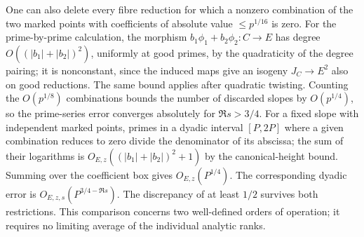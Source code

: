 \documentclass[11pt]{article}
\begin{document}
One can also delete every fibre reduction for which a nonzero combination of the two marked points with coefficients of absolute value $\le p^{1/16}$ is zero. For the prime-by-prime calculation, the morphism $b_1\phi_1+b_2\phi_2:C\to E$ has degree $O((|b_1|+|b_2|)^2)$, uniformly at good primes, by the quadraticity of the degree pairing; it is nonconstant, since the induced maps give an isogeny $J_C\to E^2$ also on good reductions. The same bound applies after quadratic twisting. Counting the $O(p^{1/8})$ combinations bounds the number of discarded slopes by $O(p^{1/4})$, so the prime-series error converges absolutely for $\Re s>3/4$. For a fixed slope with independent marked points, primes in a dyadic interval $[P,2P]$ where a given combination reduces to zero divide the denominator of its abscissa; the sum of their logarithms is $O_{E,z}((|b_1|+|b_2|)^2+1)$ by the canonical-height bound. Summing over the coefficient box gives $O_{E,z}(P^{1/4})$. The corresponding dyadic error is $O_{E,z,s}(P^{3/4-\Re s})$. The discrepancy of at least $1/2$ survives both restrictions. This comparison concerns two well-defined orders of operation; it requires no limiting average of the individual analytic ranks.
\end{document}
